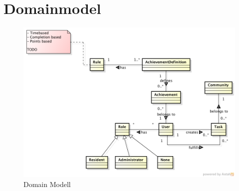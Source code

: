 \chapter{Domainmodel}

\begin{figure}[h]
	\centering
		\includegraphics[width=\textwidth]{content/images/domainmodel.png}
	\caption{Domain Modell}
\end{figure}